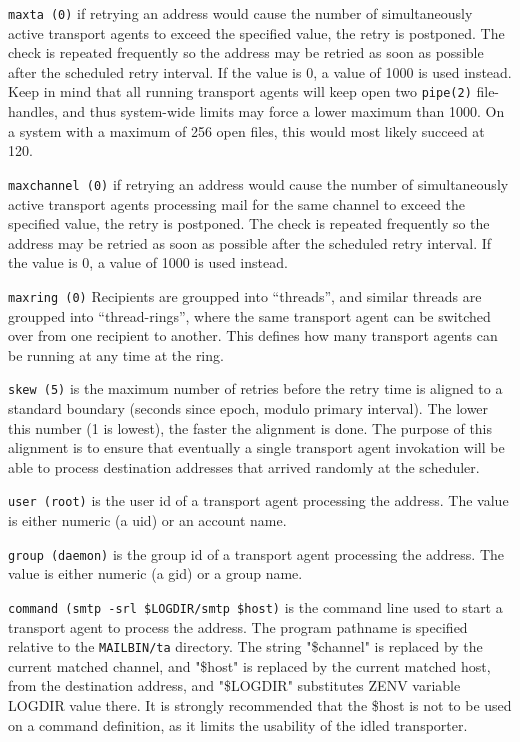 {\tt maxta (0)} 
if retrying an address would cause the number of simultaneously 
active transport agents to exceed the specified  value, the retry is  
postponed. The check is repeated  frequently so  the address may be retried as
soon as possible after the  scheduled  retry interval. If the value is 0, 
a value of 1000 is used instead. Keep in mind that all  running  
transport  agents  will  keep open two {\tt pipe(2)} file-handles, and thus 
system-wide  limits may force a lower maximum than 1000. On a system
with a maximum of 256 open files, this would most likely succeed at 120.

{\tt maxchannel (0)}
if retrying an address would cause the number of 
simultaneously  active  transport agents processing mail for
the same channel to exceed  the  specified  value,  the
retry  is  postponed.  The check is repeated frequently
so the address may be retried as soon as possible after
the  scheduled  retry  interval.   If the value is 0, a
value of 1000 is used instead.

{\tt maxring (0)}
Recipients are groupped into ``threads'',  and  similar
threads  are groupped into ``thread-rings'', where the same
transport agent can be switched over from one recipient
to another.  This defines how many transport agents can
be running at any time at the ring.

{\tt skew (5)}
is the maximum number of retries before the retry  time
is aligned to a standard boundary (seconds since epoch,
modulo primary interval).  The lower this number (1  is
lowest), the faster the alignment is done.  The purpose
of this alignment is to ensure that eventually a single
transport agent invokation will be able to process 
destination addresses that arrived randomly at the  scheduler.

{\tt user (root)}
is  the  user  id  of  a transport agent processing the
address.  The value is either numeric  (a  uid)  or  an
account name.

{\tt group (daemon)}
is  the  group  id  of a transport agent processing the
address.  The value is either  numeric  (a  gid)  or a
group name.

{\tt command (smtp -srl \$LOGDIR/smtp \$host)}
is  the command line used to start a transport agent to
process the address. The program pathname is specified
relative  to the  {\tt MAILBIN/ta}  directory.   The  string
"\$channel" is replaced by the current matched  channel,
and  "\$host" is  replaced by the current matched host,
from the destination address, and "\$LOGDIR" substitutes
ZENV variable LOGDIR value there.  It is strongly 
recommended that the \$host is not to be used on a  command
definition, as it limits the usability of the idled transporter.

